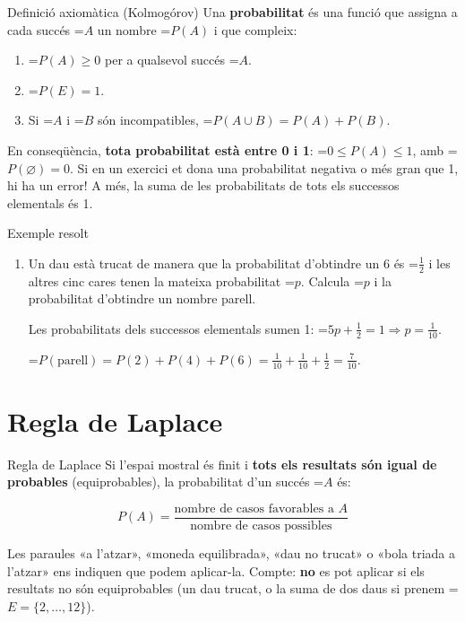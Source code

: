 \documentclass[11pt,a4paper]{article}
\newcommand{\fmm}[1]{\setbox0=\hbox{$#1$}\ifdim\wd0>\linewidth\[#1\]\else\mbox{\box0}\fi}
\newcommand{\fmpau}[1]{\tcbox[on line,colback=fmnavy,colframe=fmnavy,arc=2mm,boxsep=0pt,left=4pt,right=4pt,top=1.5pt,bottom=1.5pt]{\color{white}\scriptsize\bfseries\MakeUppercase{#1}}\ }
\begin{document}
  
\begin{fmdef}{Definició axiomàtica (Kolmogórov)}
Una \textbf{probabilitat} és una funció que assigna a cada succés \fmm{A} un nombre \fmm{P(A)} i que compleix:

      
\begin{enumerate}
\item \fmm{P(A)\geq0} per a qualsevol succés \fmm{A}.
\item \fmm{P(E)=1}.
\item Si \fmm{A} i \fmm{B} són incompatibles, \fmm{P(A\cup B)=P(A)+P(B)}.
\end{enumerate}

      
\begin{fmnote}En conseqüència, \textbf{tota probabilitat està entre 0 i 1}: \fmm{0\leq P(A)\leq1}, amb \fmm{P(\varnothing)=0}. Si en un exercici et dona una probabilitat negativa o més gran que 1, hi ha un error! A més, la suma de les probabilitats de tots els successos elementals és 1.\end{fmnote}
\end{fmdef}

  
\begin{fmex}{Exemple resolt}
\begin{enumerate}[label=\textbf{\arabic*.},leftmargin=*]
\item Un dau està trucat de manera que la probabilitat d'obtindre un 6 és \fmm{\frac12} i les altres cinc cares tenen la mateixa probabilitat \fmm{p}. Calcula \fmm{p} i la probabilitat d'obtindre un nombre parell. \fmpau{PAU}
          

            

Les probabilitats dels successos elementals sumen 1: \fmm{5p+\frac12=1\Rightarrow p=\frac{1}{10}}.

            

\fmm{P(\text{parell})=P(2)+P(4)+P(6)=\frac1{10}+\frac1{10}+\frac12=\frac{7}{10}}.
\end{enumerate}
\end{fmex}

\section{Regla de Laplace}\hypertarget{sec4}{}

  

  
\begin{fmprop}{Regla de Laplace}
Si l'espai mostral és finit i \textbf{tots els resultats són igual de probables} (equiprobables), la probabilitat d'un succés \fmm{A} és:

      
\[P(A)=\frac{\text{nombre de casos favorables a }A}{\text{nombre de casos possibles}}\]

      

Les paraules «a l'atzar», «moneda equilibrada», «dau no trucat» o «bola triada a l'atzar» ens indiquen que podem aplicar-la. Compte: \textbf{no} es pot aplicar si els resultats no són equiprobables (un dau trucat, o la suma de dos daus si prenem \fmm{E=\{2,\dots,12\}}).
\end{fmprop}
\end{document}
